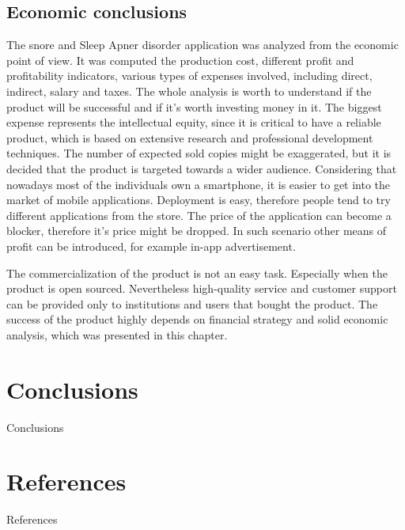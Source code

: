 \documentclass[12pt,a4paper]{report}
\begin{document}
\section{Economic conclusions}
The snore and Sleep Apner disorder application was analyzed from the economic point of view. It was computed the production cost, different profit and profitability indicators, various types of expenses involved, including direct, indirect, salary and taxes. The whole analysis is worth to understand if the product will be successful and if it's worth investing money in it. The biggest expense represents the intellectual equity, since it is critical to have a reliable product, which is based on extensive research and professional development techniques. The number of expected sold copies might be exaggerated, but it is decided that the product is targeted towards a wider audience. Considering that nowadays most of the individuals own a smartphone, it is easier to get into the market of mobile applications. Deployment is easy, therefore people tend to try different applications from the store. The price of the application can become a blocker, therefore it's price might be dropped. In such scenario other means of profit can be introduced, for example in-app advertisement. 

The commercialization of the product is not an easy task. Especially when the product is open sourced. Nevertheless high-quality service and customer support can be provided only to institutions and users that bought the product. The success of the product highly depends on financial strategy and solid economic analysis, which was presented in this chapter.

\chapter*{Conclusions}
Conclusions

\chapter*{References}
References
\end{document}
